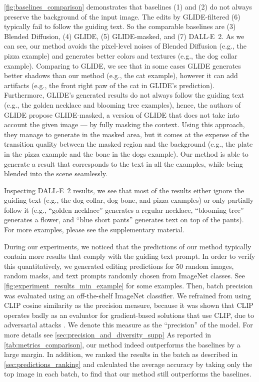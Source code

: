 \ref{fig:baselines_comparison} demonstrates that baselines (1) and (2) do not always preserve the background of the input image. The edits by GLIDE-filtered (6) typically fail to follow the guiding text. So the comparable baselines are (3) Blended Diffusion, (4) GLIDE, (5) GLIDE-masked, and (7) {DALL$\cdot$E}~2. As we can see, our method avoids the pixel-level noises of Blended Diffusion (e.g., the pizza example) and generates better colors and textures (e.g., the dog collar example). Comparing to GLIDE, we see that in some cases GLIDE generates better shadows than our method (e.g., the cat example), however it can add artifacts (e.g., the front right paw of the cat in GLIDE's prediction). Furthermore, GLIDE's generated results do not always follow the guiding text (e.g., the golden necklace and blooming tree examples), hence, the authors of GLIDE propose GLIDE-masked, a version of GLIDE that does not take into account the given image --- by fully masking the context. Using this approach, they manage to generate in the masked area, but it comes at the expense of the transition quality between the masked region and the background (e.g., the plate in the pizza example and the bone in the dogs example). Our method is able to generate a result that corresponds to the text in all the examples, while being blended into the scene seamlessly.

Inspecting {DALL$\cdot$E}~2 results, we see that most of the results either ignore the guiding text (e.g., the dog collar, dog bone, and pizza examples) or only partially follow it (e.g., ``golden necklace'' generates a regular necklace, ``blooming tree'' generates a flower, and ``blue short pants'' generates text on top of the pants). For more examples, please see the supplementary material.

During our experiments, we noticed that the predictions of our method typically contain more results that comply with the guiding text prompt. In order to verify this quantitatively, we generated editing predictions for 50 random images, random masks, and text prompts randomly chosen from ImageNet classes. See \ref{fig:experiment_results_min_example} for some examples. Then, batch precision was evaluated using an off-the-shelf ImageNet classifier. We refrained from using CLIP cosine similarity as the precision measure, because it was shown that CLIP operates badly as an evaluator for gradient-based solutions that use CLIP, due to adversarial attacks \cite{nichol2021glide}. We denote this measure as the ``precision'' of the model. For more details see 
\ref{sec:precision_and_diversity_supp}
As reported in \ref{tab:metrics_comparison}, our method indeed outperforms the baselines by a large margin. In addition, we ranked the results in the batch as described in \ref{sec:predictions_ranking} and calculated the average accuracy by taking only the top image in each batch, to find that our method still outperforms the baselines.

